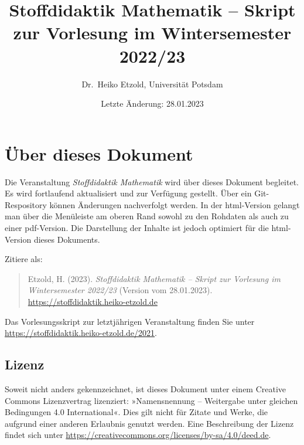 \documentclass[
]{scrbook}
\title{Stoffdidaktik Mathematik -- Skript zur Vorlesung im Wintersemester 2022/23}
\author{Dr.~Heiko Etzold, Universität Potsdam}
\date{Letzte Änderung: 28.01.2023}
\makeatletter
\def\renewtheorem#1{%
  \expandafter\let\csname#1\endcsname\relax
  \expandafter\let\csname c@#1\endcsname\relax
  \gdef\renewtheorem@envname{#1}
  \renewtheorem@secpar
}
\def\renewtheorem@secpar{\@ifnextchar[{\renewtheorem@numberedlike}{\renewtheorem@nonumberedlike}}
\def\renewtheorem@numberedlike[#1]#2{\newtheorem{\renewtheorem@envname}[#1]{#2}}
\def\renewtheorem@nonumberedlike#1{
\def\renewtheorem@caption{#1}
\edef\renewtheorem@nowithin{\noexpand\newtheorem{\renewtheorem@envname}{\renewtheorem@caption}}
\renewtheorem@thirdpar
}
\def\renewtheorem@thirdpar{\@ifnextchar[{\renewtheorem@within}{\renewtheorem@nowithin}}
\def\renewtheorem@within[#1]{\renewtheorem@nowithin[#1]}
\theoremstyle{definition}
\theoremstyle{definition}
\theoremstyle{definition}
\theoremstyle{definition}
\theoremstyle{remark}
\makeatother
\begin{document}
\maketitle

% 

{
\hypersetup{linkcolor=}
\setcounter{tocdepth}{1}
\tableofcontents
}
\hypertarget{uxfcber-dieses-dokument}{%
\chapter*{Über dieses Dokument}\label{uxfcber-dieses-dokument}}

Die Veranstaltung \emph{Stoffdidaktik Mathematik} wird über dieses Dokument begleitet. Es wird fortlaufend aktualisiert und zur Verfügung gestellt. Über ein Git-Respository können Änderungen nachverfolgt werden. In der html-Version gelangt man über die Menüleiste am oberen Rand sowohl zu den Rohdaten als auch zu einer pdf-Version. Die Darstellung der Inhalte ist jedoch optimiert für die html-Version dieses Dokuments.

Zitiere als:

\begin{quote}
Etzold, H. (2023). \emph{Stoffdidaktik Mathematik -- Skript zur Vorlesung im Wintersemester 2022/23} (Version vom 28.01.2023). \url{https://stoffdidaktik.heiko-etzold.de}
\end{quote}

Das Vorlesungsskript zur letztjährigen Veranstaltung finden Sie unter \url{https://stoffdidaktik.heiko-etzold.de/2021}.

\hypertarget{lizenz}{%
\section*{Lizenz}\label{lizenz}}

Soweit nicht anders gekennzeichnet, ist dieses Dokument unter einem Creative Commons Lizenzvertrag lizenziert: »Namensnennung -- Weitergabe unter gleichen Bedingungen 4.0 International«. Dies gilt nicht für Zitate und Werke, die aufgrund einer anderen Erlaubnis genutzt werden.
Eine Beschreibung der Lizenz findet sich unter \url{https://creativecommons.org/licenses/by-sa/4.0/deed.de}.
\end{document}
